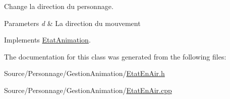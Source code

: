 Change la direction du personnage. 


\begin{DoxyParams}{Parameters}
{\em d} & La direction du mouvement \\
\hline
\end{DoxyParams}


Implements \hyperlink{classEtatAnimation_a09e0277b2679249f33e6b95047cb9378}{Etat\-Animation}.



The documentation for this class was generated from the following files\-:\begin{DoxyCompactItemize}
\item 
Source/\-Personnage/\-Gestion\-Animation/\hyperlink{EtatEnAir_8h}{Etat\-En\-Air.\-h}\item 
Source/\-Personnage/\-Gestion\-Animation/\hyperlink{EtatEnAir_8cpp}{Etat\-En\-Air.\-cpp}\end{DoxyCompactItemize}
